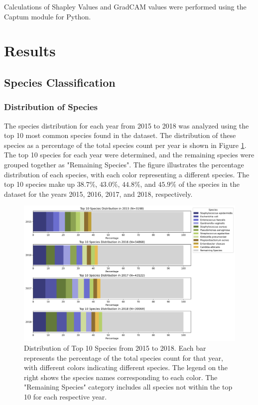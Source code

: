 \documentclass[english,11pt,a4paper,titlepage]{article}
\begin{document}
	Calculations of Shapley Values and GradCAM values were performed using the Captum \cite{kokhlikyanCaptumUnifiedGeneric} module for Python.

\section*{Results}
\subsection*{Species Classification}
\subsubsection*{Distribution of Species}
The species distribution for each year from 2015 to 2018 was analyzed using the top 10 most common species found in the dataset. The distribution of these species as a percentage of the total species count per year is shown in Figure \ref{fig:species_distribution}. 
The top 10 species for each year were determined, and the remaining species were grouped together as "Remaining Species". The figure illustrates the percentage distribution of each species, with each color representing a different species. The top 10 species make up \( 38.7\% \), \( 43.0\% \), \( 44.8\% \), and \( 45.9\% \) of the species in the dataset for the years 2015, 2016, 2017, and 2018, respectively.
\begin{figure}[h]
	\centering
	\includegraphics[width=0.9\linewidth]{img/species_distribution.png}
	\caption{Distribution of Top 10 Species from 2015 to 2018. Each bar represents the percentage of the total species count for that year, with different colors indicating different species. The legend on the right shows the species names corresponding to each color. The "Remaining Species" category includes all species not within the top 10 for each respective year.}
	\label{fig:species_distribution}
\end{figure}
\end{document}
